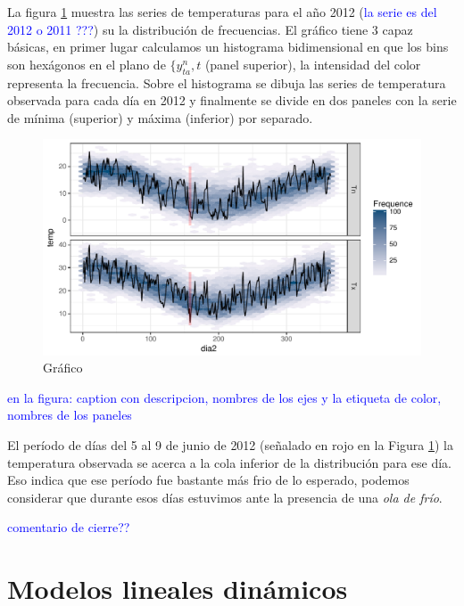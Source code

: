 \documentclass[12pt]{article}\usepackage[]{graphicx}\usepackage[]{color}
\makeatletter
\def\maxwidth{ %
  \ifdim\Gin@nat@width>\linewidth
    \linewidth
  \else
    \Gin@nat@width
  \fi
}
\newenvironment{knitrout}{}{} %
\makeatother
\begin{document}
La figura \ref{fig:graf1} muestra las series de temperaturas para el año 2012 (\textcolor{blue}{la serie es del 2012 o 2011 ???}) su la distribución de frecuencias. El gráfico tiene 3 capaz básicas, en primer lugar calculamos un histograma bidimensional en que los bins son hexágonos en el plano de $\{ y^n_{ta}, t$ (panel superior), la intensidad del color representa la frecuencia. Sobre el histograma se dibuja las series de temperatura observada para cada día en 2012 y finalmente se divide en dos paneles con la serie de mínima (superior) y máxima (inferior) por separado. 

\begin{knitrout}
\color{fgcolor}\begin{figure}

{\centering \includegraphics[width=\maxwidth]{figure/graf1-1} 

}

\caption[Gráfico]{Gráfico}\label{fig:graf1}
\end{figure}


\end{knitrout}
\textcolor{blue}{en la figura: caption con descripcion, nombres de los ejes y la etiqueta de color, nombres de los paneles}

El período de días del 5 al 9 de junio de 2012 (señalado en rojo en la Figura \ref{fig:graf1}) la temperatura observada se acerca a la cola inferior de la distribución para ese día. Eso indica que ese período fue bastante más frio de lo esperado, podemos considerar que durante esos días estuvimos ante la presencia de una \textit{ola de frío}. 

\textcolor{blue}{comentario de cierre??}

\section{Modelos lineales dinámicos}\label{DLM}
\end{document}
